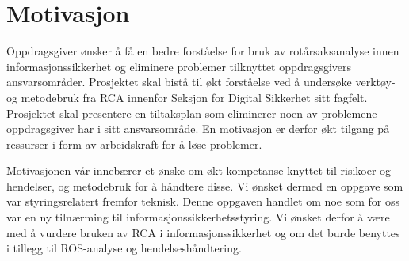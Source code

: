 \section{Motivasjon}
\label{sec:motivasjon}
Oppdragsgiver ønsker å få en bedre forståelse for bruk av rotårsaksanalyse innen informasjonssikkerhet og eliminere problemer tilknyttet oppdragsgivers ansvarsområder. Prosjektet skal bistå til økt forståelse ved å undersøke verktøy- og metodebruk fra RCA innenfor Seksjon for Digital Sikkerhet sitt fagfelt. Prosjektet skal presentere en tiltaksplan som eliminerer noen av problemene oppdragsgiver har i sitt ansvarsområde. En motivasjon er derfor økt tilgang på ressurser i form av arbeidskraft for å løse problemer. 


Motivasjonen vår innebærer et ønske om økt kompetanse knyttet til risikoer og hendelser, og metodebruk for å håndtere disse. Vi ønsket dermed en oppgave som var styringsrelatert fremfor teknisk. Denne oppgaven handlet om noe som for oss var en ny tilnærming til informasjonssikkerhetsstyring. Vi ønsket derfor å være med å vurdere bruken av RCA i informasjonssikkerhet og om det burde benyttes i tillegg til ROS-analyse og hendelseshåndtering. 